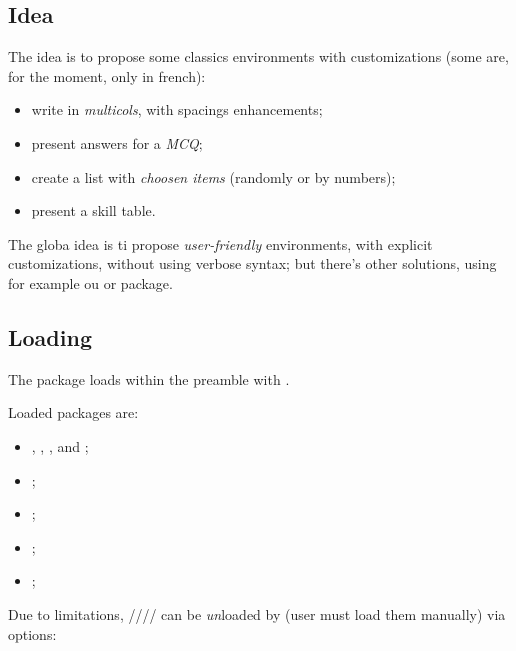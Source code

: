 \documentclass[english,11pt,a4paper]{article}
\begin{document}
\subsection{Idea}

The idea is to propose some classics environments with customizations (some are, for the moment, only in french):

\begin{itemize}
	\item write in \textit{multicols}, with spacings enhancements;
	\item present answers for a \textit{MCQ};
	\item create a list with \textit{choosen items} (randomly or by numbers);
	\item present a skill table.
\end{itemize}

\smallskip

The globa idea is ti propose \textit{user-friendly} environments, with explicit customizations, without using verbose syntax; but there's other solutions, using for example  ou  or  package.

\subsection{Loading}

The package loads within the preamble with .

Loaded packages are:

\begin{itemize}
	\item {}, , ,  and ;
	\item {};
	\item {};
	\item {};
	\item {};
\end{itemize}

Due to limitations, //// can be \textit{un}loaded by  (user must load them manually) via options:
\end{document}

